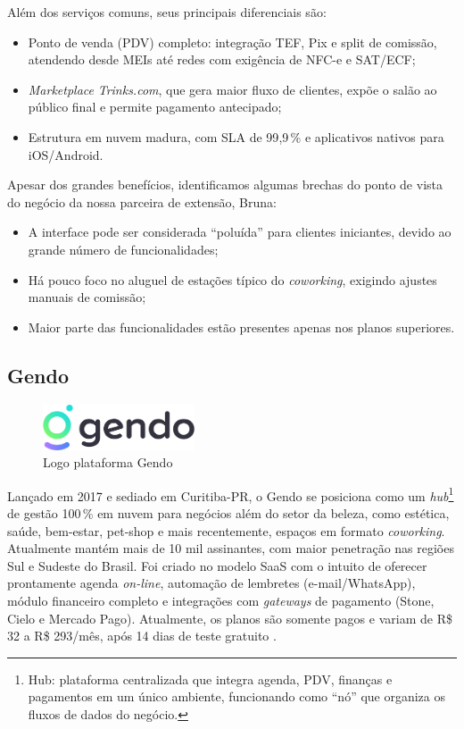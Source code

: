 Além dos serviços comuns, seus principais diferenciais são:

\begin{itemize}
	\item Ponto de venda (PDV) completo: integração TEF, Pix e split de comissão, atendendo desde
	MEIs até redes com exigência de NFC-e e SAT/ECF;
	\item \emph{Marketplace} \textit{Trinks.com}, que gera maior fluxo de clientes, expõe o salão ao
	público final e permite pagamento antecipado;
	\item Estrutura em nuvem madura, com SLA de 99{,}9\,\% e aplicativos nativos para
	iOS/Android.
\end{itemize}

Apesar dos grandes benefícios, identificamos algumas brechas do ponto de vista do negócio da nossa
parceira de extensão, Bruna:

\begin{itemize}
	\item A interface pode ser considerada “poluída” para clientes iniciantes, devido ao grande
	número de funcionalidades;
	\item Há pouco foco no aluguel de estações típico do \emph{coworking}, exigindo ajustes manuais de
	comissão;
	\item Maior parte das funcionalidades estão presentes apenas nos planos superiores.
\end{itemize}

\subsection{Gendo}

\begin{figure}[htb]
	\centering
	\includegraphics[width=0.4\textwidth]{cap01-Introducao/Images/1.4.2_Gendo}
	\caption{Logo plataforma Gendo}
	\label{fig:Gendo}
\end{figure}

 \FloatBarrier

Lançado em 2017 e sediado em Curitiba-PR, o Gendo se posiciona como um \emph{hub}\footnote{Hub: plataforma centralizada que integra agenda, PDV, finanças e pagamentos em um único ambiente, funcionando como “nó” que organiza os fluxos de dados do negócio.} de gestão 100\,\% em nuvem para negócios além do setor da beleza, como estética, saúde, bem-estar, pet-shop e mais recentemente, espaços em formato \emph{coworking}. 
Atualmente mantém mais de 10 mil assinantes, com maior penetração nas regiões Sul e Sudeste do Brasil. Foi criado no modelo SaaS com o intuito de oferecer prontamente agenda \emph{on-line}, automação de lembretes (e-mail/WhatsApp), módulo financeiro completo e integrações com \emph{gateways} de pagamento (Stone, Cielo e Mercado Pago). Atualmente, os planos são somente pagos e variam de R\$ 32 a R\$ 293/mês, após 14 dias de teste gratuito \cite{Gendo}.

